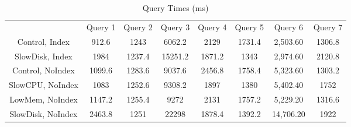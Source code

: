 \newpage
{}

\begin{table}[h]
    \centering
    \begin{tabular}{c|ccccccc}
    & Query 1 & Query 2 & Query 3 & Query 4 & Query 5 & Query 6 & Query 7 \\
    Control, Index & 912.6 & 1243 & 6062.2 & 2129 & 1731.4 & 2,503.60 & 1306.8 \\
SlowDisk, Index & 1984 & 1237.4 & 15251.2 & 1871.2 & 1343 & 2,974.60 & 2120.8 \\
Control, NoIndex & 1099.6 & 1283.6 & 9037.6 & 2456.8 & 1758.4 & 5,323.60 & 1303.2 \\ 
SlowCPU, NoIndex & 1083 & 1252.6 & 9308.2 & 1897 & 1380 & 5,402.40 & 1752 \\ 
LowMem, NoIndex & 1147.2 & 1255.4 & 9272 & 2131 & 1757.2 & 5,229.20 & 1316.6 \\ 
SlowDisk, NoIndex & 2463.8 & 1251 & 22298 & 1878.4 & 1392.2 & 14,706.20 & 1922

    \end{tabular}
    \caption{Query Times (ms)}
    \label{tab:my_label}
\end{table}